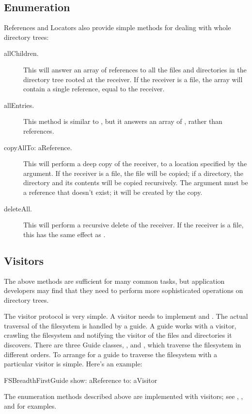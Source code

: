 \documentclass[a4paper,10pt,twoside]{book}
\begin{document}
\subsection{Enumeration}

References and Locators also provide simple methods for dealing with whole directory trees:

\begin{description}
\item[allChildren.]

This will answer an array of references to all the files and directories in the directory tree rooted at the receiver. If the receiver is a file, the array will contain a single reference, equal to the receiver.

\item[allEntries.]
This method is similar to , but it answers an array of , rather than references.

\item[copyAllTo: aReference.]

This will perform a deep copy of the receiver, to a location specified by the argument. If the receiver is a file, the file will be copied; if a directory, the directory and its contents will be copied recursively. The argument must be a reference that doesn't exist; it will be created by the copy.

\item[deleteAll.]

This will perform a recursive delete of the receiver. If the receiver is a file, this has the same effect as .
\end{description}

\subsection{Visitors}

The above methods are sufficient for many common tasks, but application developers may find that they need to perform more sophisticated operations on directory trees.

The visitor protocol is very simple. A visitor needs to implement  and . The actual traversal of the filesystem is handled by a guide. A guide works with a visitor, crawling the filesystem and notifying the visitor of the files and directories it discovers. There are three Guide classes, ,  and  , which traverse the filesystem in different orders. To arrange for a guide to traverse the filesystem with a particular visitor is simple. Here's an example:

\begin{code}{}
    FSBreadthFirstGuide show: aReference to: aVisitor
\end{code}	

The enumeration methods described above are implemented with visitors; see , , and  for examples.



\ifx\wholebook\relax\else
   
   
\end{document}

